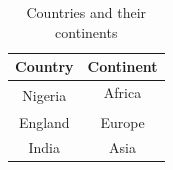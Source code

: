 \documentclass{article}
\begin{document}
	\begin{table}[h!]
		\begin{center}
		\caption{Countries and their continents}
		\begin{tabular}{c|c}
		\textbf{Country} & \textbf{Continent}\\
		\hline
		\multirow{2}{2 cm}{Nigeria} & Africa\\
		              Ghana &    \\
		              \hline
		              England & Europe\\ 
		              India & Asia	
		\end{tabular}
		\end{center}
	\end{table}
\end{document}
